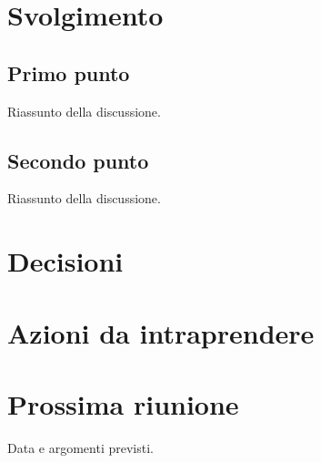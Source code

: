\section{Svolgimento}
\subsection{Primo punto}
Riassunto della discussione.

\subsection{Secondo punto}
Riassunto della discussione.

\section{Decisioni}
\begin{decisioni}
\end{decisioni}

\section{Azioni da intraprendere}
\begin{azioni}
\end{azioni}

\section{Prossima riunione}
Data e argomenti previsti.


